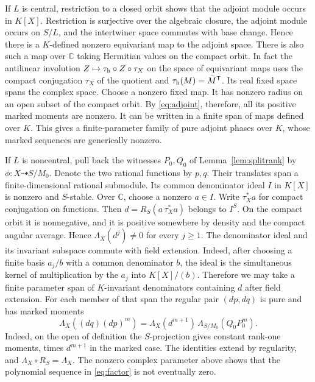 \documentclass[11pt]{article}
\newcommand{\CC}{\mathbb C}
\begin{document}
If \(L\) is central, restriction to a closed orbit shows that the
adjoint module occurs in \(K[X]\). Restriction is surjective over
the algebraic closure, the adjoint module occurs on \(S/L\), and
the intertwiner space commutes with base change. Hence there is
a \(K\)-defined nonzero equivariant map to the adjoint space.
There is also such a map over \(\CC\) taking Hermitian values on the
compact orbit. In fact the antilinear involution
\(
 Z\mapsto \tau_{\rm h}\circ Z\circ\tau_X
\)
on the space of equivariant maps uses the compact conjugation
\(\tau_X\) of the quotient and \(\tau_{\rm h}(M)=\bar M^{\mathsf T}\).
Its real fixed space spans the complex space. Choose a nonzero
fixed map. It has nonzero radius on an open subset of the compact
orbit. By \eqref{eq:adjoint}, therefore, all its positive marked
moments are nonzero. It can be written in a finite span of maps
defined over \(K\). This gives a finite-parameter family of pure
adjoint phases over \(K\), whose marked sequences are generically
nonzero.

If \(L\) is noncentral, pull back the witnesses \(P_0,Q_0\) of
Lemma~\ref{lem:splitrank} by \(\phi:X\dashrightarrow S/M_0\). Denote the two rational functions
by \(p,q\). Their translates span a finite-dimensional rational
submodule. Its common denominator ideal \(I\) in \(K[X]\) is nonzero
and \(S\)-stable. Over \(\CC\), choose a nonzero \(a\in I\). Write
\(\tau_X^*a\) for compact conjugation on functions.
Then \(d=R_S(a\,\tau_X^*a)\) belongs to \(I^S\).
On the compact orbit it is nonnegative, and it is positive somewhere
by density and the compact angular average. Hence
\(\Lambda_X(d^j)\ne0\) for every \(j\ge1\). The denominator ideal
and its invariant subspace commute with field extension. Indeed,
after choosing a finite basis \(a_j/b\) with a common denominator
\(b\), the ideal is the simultaneous kernel of multiplication
by the \(a_j\) into \(K[X]/(b)\). Therefore we may take a finite
parameter span of \(K\)-invariant denominators containing \(d\)
after field extension. For each member of that span the regular pair
\((dp,dq)\) is pure and has marked moments
\begin{equation}\label{eq:factor}
 \Lambda_X((dq)(dp)^m)
    =\Lambda_X(d^{m+1})\,\Lambda_{S/M_0}(Q_0P_0^m).
\end{equation}
Indeed, on the open of definition the \(S\)-projection gives constant
rank-one moments, times \(d^{m+1}\) in the marked case. The identities
extend by regularity, and \(\Lambda_X\circ R_S=\Lambda_X\).
The nonzero complex parameter above shows that the polynomial sequence
in \eqref{eq:factor} is not eventually zero.
\end{document}
